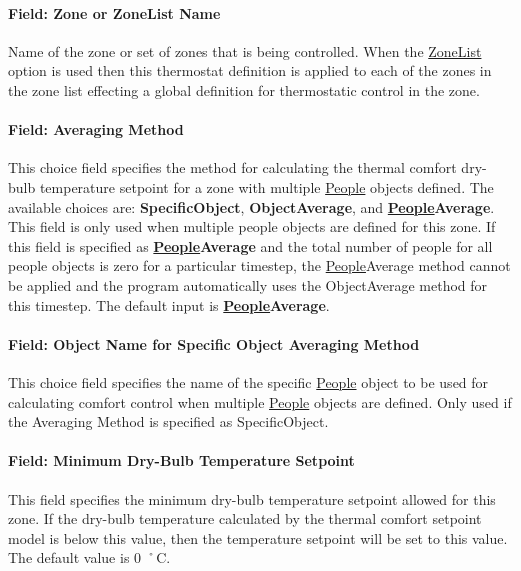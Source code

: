 \paragraph{Field: Zone or ZoneList Name}\label{field-zone-or-zonelist-name-2-000}

Name of the zone or set of zones that is being controlled. When the \hyperref[zonelist]{ZoneList} option is used then this thermostat definition is applied to each of the zones in the zone list effecting a global definition for thermostatic control in the zone.

\paragraph{Field: Averaging Method}\label{field-averaging-method}

This choice field specifies the method for calculating the thermal comfort dry-bulb temperature setpoint for a zone with multiple \hyperref[people]{People} objects defined. The available choices are: \textbf{SpecificObject}, \textbf{ObjectAverage}, and \textbf{\hyperref[people]{People}Average}. This field is only used when multiple people objects are defined for this zone. If this field is specified as \textbf{\hyperref[people]{People}Average} and the total number of people for all people objects is zero for a particular timestep, the \hyperref[people]{People}Average method cannot be applied and the program automatically uses the ObjectAverage method for this timestep. The default input is \textbf{\hyperref[people]{People}Average}.

\paragraph{Field: Object Name for Specific Object Averaging Method}\label{field-object-name-for-specific-object-averaging-method}

This choice field specifies the name of the specific \hyperref[people]{People} object to be used for calculating comfort control when multiple \hyperref[people]{People} objects are defined. Only used if the Averaging Method is specified as SpecificObject.

\paragraph{Field: Minimum Dry-Bulb Temperature Setpoint}\label{field-minimum-dry-bulb-temperature-setpoint}

This field specifies the minimum dry-bulb temperature setpoint allowed for this zone. If the dry-bulb temperature calculated by the thermal comfort setpoint model is below this value, then the temperature setpoint will be set to this value. The default value is 0 ˚C.

